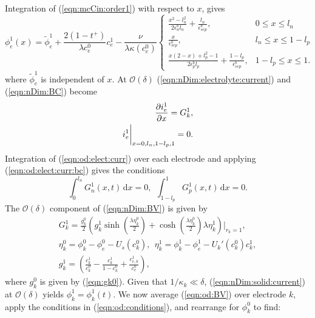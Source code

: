 \documentclass[preprint]{elsarticle}
\begin{document}
Integration of (\ref{eqn:mcCin:order1}) with respect to $x$, gives
\begin{equation} 
	\phi_e^1(x) =\tilde{\phi}_e^1 + \frac{2(1-t^+)}{\lambda c_e^0}c_e^1 - \frac{\nu}{\lambda \kappa(c_e^0)}
    \begin{cases} 
    	   \frac{x^2-l_n^2}{2 \epsilon_n^b l_n} + \frac{l_n}{\epsilon_{sep}^b}, & 0\leq x \leq l_n \\
    	   \frac{x}{\epsilon_{sep}^b}, & l_n\leq x \leq 1-l_p \\
    	   \frac{x(2-x)+l_p^2-1}{2\epsilon_p^b l_p} + \frac{1-l_p}{\epsilon_{sep}^b}, & 1-l_p\leq x \leq 1.
    \end{cases}  
\end{equation} 
where $\tilde{\phi}_e^1$ is independent of $x$. At $\mathcal{O}(\delta)$ (\ref{eqn:nDim:electrolyte:current}) and (\ref{eqn:nDim:BC}) become
\begin{subequations} 
\begin{align}
	\pdv{i_e^1}{x} = G_k^1, \label{eqn:od:elect:curr}\\ 
	i_e^1\bigg|_{x=0,l_n,1-l_p,1} = 0. \label{eqn:od:elect:curr:bc}
\end{align} 
\end{subequations}
Integration of (\ref{eqn:od:elect:curr}) over each electrode and applying (\ref{eqn:od:elect:curr:bc}) gives the conditions
\begin{equation}\label{eqn:od:conditions} 
	\int_0^{l_n} G_n^1(x,t)\, \text{d}x = 0, \ \ \int_{1-l_p}^1 G_p^1(x,t)\, \text{d}x = 0. 
\end{equation}
The $\mathcal{O}(\delta)$ component of (\ref{eqn:nDim:BV}) is given by
\begin{subequations} 
    \begin{gather} \label{eqn:od:BV}
    	G_k^1 = \frac{g_k^0}{2} \left( g_k^1 \sinh\left( \frac{\lambda\eta_k^0}{2}  \right) + \cosh(\frac{\lambda\eta_k^0}{2} ) \lambda \eta_k^1 \right)\bigg|_{r_k=1}, \\ \eta_k^0 = \phi^0_k - \phi^0_e - U_s(c_k^0), \ \ \eta_k^1 = \phi^1_k - \phi^1_e - U_k'(c^0_k)c_k^1,\\
    g_k^1 = \left(\frac{c_k^1}{c_k^0} - \frac{c_k^1}{1-c_k^0} + \frac{c_{e,k}^1}{c_e^0} \right), 
    \end{gather} 
\end{subequations} 
where $g_k^0$ is given by (\ref{eqn:gk0}). Given that $1/\kappa_k\ll\delta$, (\ref{eqn:nDim:solid:current}) at $\mathcal{O}(\delta)$ yields $\phi_k^1=\phi_k^1(t)$. We now average (\ref{eqn:od:BV}) over electrode $k$, apply the conditions in (\ref{eqn:od:conditions}), and rearrange for $\phi_k^0$ to find:
\end{document}
